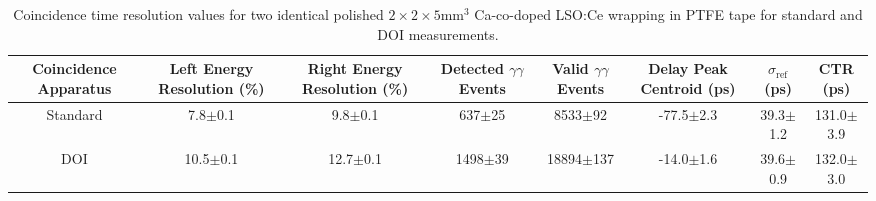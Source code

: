 \begin{table}
\caption{\label{tab:referencevals} Coincidence time resolution values for two identical polished $2\times2\times5$mm$^3$ Ca-co-doped LSO:Ce wrapping in PTFE tape for standard and DOI measurements.}
\begin{tabular}{cccccccc}
Coincidence Apparatus & Left Energy Resolution (\%) & Right Energy Resolution (\%) & Detected $\gamma\gamma$ Events & Valid $\gamma\gamma$ Events & Delay Peak Centroid (ps) & $\sigma_\textrm{ref}$ (ps) & CTR (ps)\\
\hline
Standard &   7.8$\pm$0.1 &   9.8$\pm$0.1 &   637$\pm$25 &    8533$\pm$92 &  -77.5$\pm$2.3 &   39.3$\pm$1.2 &  131.0$\pm$3.9 \\
     DOI &  10.5$\pm$0.1 &  12.7$\pm$0.1 &  1498$\pm$39 &  18894$\pm$137 &  -14.0$\pm$1.6 &   39.6$\pm$0.9 &  132.0$\pm$3.0 \\
\hline
\end{tabular}
\end{table}

